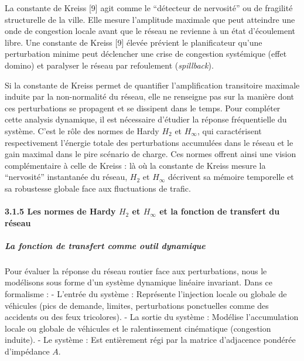 \documentclass[10pt, a4paper]{article}
\begin{document}
La constante de Kreiss {[}9{]} agit comme le ``détecteur de nervosité''
ou de fragilité structurelle de la ville. Elle mesure l'amplitude
maximale que peut atteindre une onde de congestion locale avant que le
réseau ne revienne à un état d'écoulement libre. Une constante de Kreiss
{[}9{]} élevée prévient le planificateur qu'une perturbation minime peut
déclencher une crise de congestion systémique (effet domino) et
paralyser le réseau par refoulement (\emph{spillback}).

Si la constante de Kreiss permet de quantifier l'amplification
transitoire maximale induite par la non-normalité du réseau, elle ne
renseigne pas sur la manière dont ces perturbations se propagent et se
dissipent dans le temps. Pour compléter cette analysis dynamique, il est
nécessaire d'étudier la réponse fréquentielle du système. C'est le rôle
des normes de Hardy \(H_2\) et \(H_\infty\), qui caractérisent
respectivement l'énergie totale des perturbations accumulées dans le
réseau et le gain maximal dans le pire scénario de charge. Ces normes
offrent ainsi une vision complémentaire à celle de Kreiss : là où la
constante de Kreiss mesure la ``nervosité'' instantanée du réseau,
\(H_2\) et \(H_\infty\) décrivent sa mémoire temporelle et sa robustesse
globale face aux fluctuations de trafic.

\paragraph{\texorpdfstring{3.1.5 Les normes de Hardy \(H_2\) et
\(H_\infty\) et la fonction de transfert du
réseau}{3.1.5 Les normes de Hardy H\_2 et H\_\textbackslash infty et la fonction de transfert du réseau}}\label{les-normes-de-hardy-h_2-et-h_infty-et-la-fonction-de-transfert-du-ruxe9seau}

\subparagraph{La fonction de transfert comme outil
dynamique}\label{la-fonction-de-transfert-comme-outil-dynamique}

Pour évaluer la réponse du réseau routier face aux perturbations, nous
le modélisons sous forme d'un système dynamique linéaire invariant. Dans
ce formalisme : - L'entrée du système : Représente l'injection locale ou
globale de véhicules (pics de demande, limites, perturbations
ponctuelles comme des accidents ou des feux tricolores). - La sortie du
système : Modélise l'accumulation locale ou globale de véhicules et le
ralentissement cinématique (congestion induite). - Le système : Est
entièrement régi par la matrice d'adjacence pondérée d'impédance \(A\).
\end{document}
